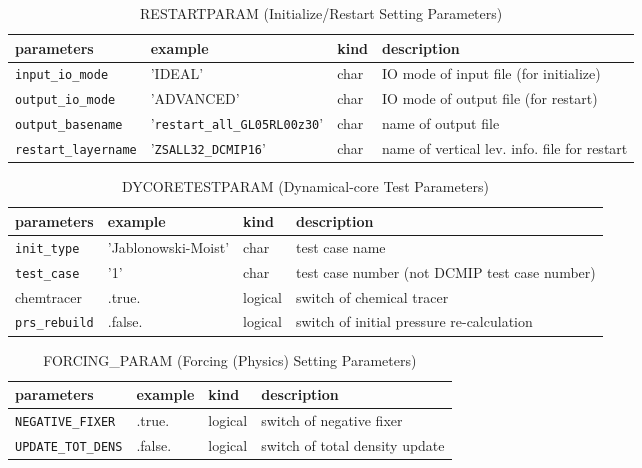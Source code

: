 \documentclass[a4paper]{article}
\begin{document}
\begin{table}[htb]
\begin{center}
\caption{RESTARTPARAM (Initialize/Restart Setting Parameters)}
\begin{tabularx}{150mm}{|l|l|l|X|} \hline
 \rowcolor[gray]{0.9} parameters & example & kind & description          \\ \hline
 \verb|input_io_mode|     & 'IDEAL'                   & char & IO mode of input file (for initialize) \\ \hline
 \verb|output_io_mode|    & 'ADVANCED'                & char & IO mode of output file (for restart) \\ \hline
 \verb|output_basename|   & '\verb|restart_all_GL05RL00z30|' & char & name of output file \\ \hline
 \verb|restart_layername| & '\verb|ZSALL32_DCMIP16|'         & char & name of vertical lev. info. file for restart \\ \hline
\end{tabularx}
\end{center}
\end{table}

\begin{table}[htb]
\begin{center}
\caption{DYCORETESTPARAM (Dynamical-core Test Parameters)}
\begin{tabularx}{150mm}{|l|l|l|X|} \hline
 \rowcolor[gray]{0.9} parameters & example & kind & description          \\ \hline
 \verb|init_type|    & 'Jablonowski-Moist' & char & test case name \\ \hline
 \verb|test_case|    & '1'     & char & test case number (not DCMIP test case number) \\ \hline
 chemtracer   & .true.  & logical & switch of chemical tracer \\ \hline
 \verb|prs_rebuild|  & .false. & logical & switch of initial pressure re-calculation\\ \hline
\end{tabularx}
\end{center}
\end{table}

\begin{table}[htb]
\begin{center}
\caption{FORCING\_PARAM (Forcing (Physics) Setting Parameters)}
\begin{tabularx}{150mm}{|l|l|l|X|} \hline
 \rowcolor[gray]{0.9} parameters & example & kind & description          \\ \hline
 \verb|NEGATIVE_FIXER|  & .true.  & logical & switch of negative fixer \\ \hline
 \verb|UPDATE_TOT_DENS| & .false. & logical & switch of total density update \\ \hline
\end{tabularx}
\end{center}
\end{table}
\end{document}
